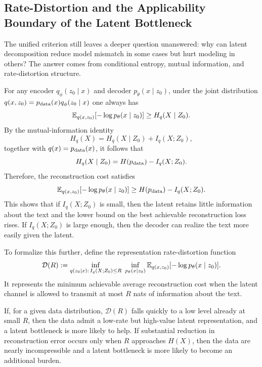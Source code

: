 \subsection{Rate-Distortion and the Applicability Boundary of the Latent Bottleneck}
\label{app:rate_distortion}

The unified criterion still leaves a deeper question unanswered: why can latent decomposition reduce model mismatch in some cases but hurt modeling in others? The answer comes from conditional entropy, mutual information, and rate-distortion structure.

For any encoder $q_{\phi}(z_0\mid x)$ and decoder $p_{\theta}(x\mid z_0)$, under the joint distribution $q(x,z_0)=p_{\mathrm{data}}(x)q_{\phi}(z_0\mid x)$ one always has
\begin{equation}
\mathbb{E}_{q(x,z_0)}[-\log p_{\theta}(x\mid z_0)]
\ge
H_q(X\mid Z_0).
\label{eq:app_reconstruction_lower_bound}
\end{equation}
By the mutual-information identity
\begin{equation}
H_q(X)=H_q(X\mid Z_0)+I_q(X;Z_0),
\label{eq:app_entropy_mi_identity}
\end{equation}
together with $q(x)=p_{\mathrm{data}}(x)$, it follows that
\begin{equation}
H_q(X\mid Z_0)=H(p_{\mathrm{data}})-I_q(X;Z_0).
\label{eq:app_conditional_entropy_as_entropy_minus_mi}
\end{equation}
Therefore, the reconstruction cost satisfies
\begin{equation}
\mathbb{E}_{q(x,z_0)}[-\log p_{\theta}(x\mid z_0)]
\ge
H(p_{\mathrm{data}})-I_q(X;Z_0).
\label{eq:app_reconstruction_bound_by_mi}
\end{equation}
This shows that if $I_q(X;Z_0)$ is small, then the latent retains little information about the text and the lower bound on the best achievable reconstruction loss rises. If $I_q(X;Z_0)$ is large enough, then the decoder can realize the text more easily given the latent.

To formalize this further, define the representation rate-distortion function
\begin{equation}
\mathcal D(R)
:=
\inf_{q(z_0\mid x):\,I_q(X;Z_0)\le R}
\ \inf_{p_{\theta}(x\mid z_0)}
\mathbb{E}_{q(x,z_0)}[-\log p_{\theta}(x\mid z_0)].
\label{eq:app_representation_rate_distortion}
\end{equation}
It represents the minimum achievable average reconstruction cost when the latent channel is allowed to transmit at most $R$ nats of information about the text.

If, for a given data distribution, $\mathcal D(R)$ falls quickly to a low level already at small $R$, then the data admit a low-rate but high-value latent representation, and a latent bottleneck is more likely to help. If substantial reduction in reconstruction error occurs only when $R$ approaches $H(X)$, then the data are nearly incompressible and a latent bottleneck is more likely to become an additional burden.

